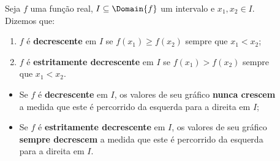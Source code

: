 \begin{frame}
  \begin{columns}[onlytextwidth]
    \begin{column}{0.49\textwidth}\vspace*{-0.5cm}
      \begin{definition}
        Seja $f$ uma função real, $I\subseteq\Domain{f}$ um intervalo e $x_{1},x_{2}\in I$. Dizemos que: 
        \begin{enumerate}
          \item $f$ é \textbf{decrescente} em $I$ se $f(x_{1}) \geq f(x_{2})$ sempre que $x_{1} < x_{2}$;
          \item $f$ é \textbf{estritamente decrescente} em $I$ se $f(x_{1}) > f(x_{2})$ sempre que $x_{1} < x_{2}$.
        \end{enumerate}
      \end{definition}
      \vspace*{-0.1cm}
      \begin{itemize}
        \item Se $f$ é \textbf{decrescente} em $I$, os valores de seu gráfico \textbf{nunca crescem} a medida que este é percorrido da esquerda para a direita em $I$;
        \item Se $f$ é \textbf{estritamente decrescente} em $I$, os valores de seu gráfico \textbf{sempre decrescem} a medida que este é percorrido da esquerda para a direita em $I$.
      \end{itemize}
    \end{column}
    \begin{column}{0.49\textwidth}
      \begin{figure}
      \end{figure}
    \end{column}
  \end{columns}
\end{frame}

